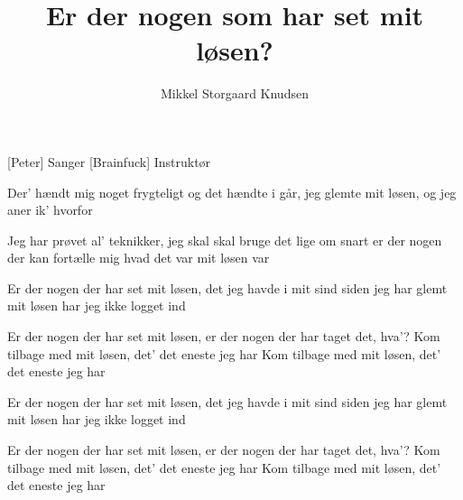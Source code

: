 \documentclass[a4paper,11pt]{article}
\title{Er der nogen som har set mit løsen?}
\author{Mikkel Storgaard Knudsen}
\begin{document}
\maketitle

\begin{roles}
[Peter] Sanger
[Brainfuck] Instruktør
\end{roles}

\begin{sketch}
\end{sketch}

\begin{song}
%
Der' hændt mig noget frygteligt og det hændte i går,
jeg glemte mit løsen, og jeg aner ik' hvorfor

Jeg har prøvet al' teknikker, jeg skal skal bruge det lige om snart
er der nogen der kan fortælle mig hvad det var mit løsen var

Er der nogen der har set mit løsen,
det jeg havde i mit sind
siden jeg har glemt mit løsen
har jeg ikke logget ind

Er der nogen der har set mit løsen,
er der nogen der har taget det, hva'?
Kom tilbage med mit løsen, det' det eneste jeg har
Kom tilbage med mit løsen, det' det eneste jeg har


%
Er der nogen der har set mit løsen,
det jeg havde i mit sind
siden jeg har glemt mit løsen
har jeg ikke logget ind

Er der nogen der har set mit løsen,
er der nogen der har taget det, hva'?
Kom tilbage med mit løsen, det' det eneste jeg har
Kom tilbage med mit løsen, det' det eneste jeg har


\end{song}
\end{document}
